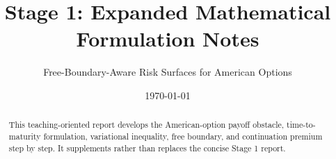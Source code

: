 \documentclass[11pt]{article}
\title{Stage 1: Expanded Mathematical Formulation Notes}
\author{Free-Boundary-Aware Risk Surfaces for American Options}
\date{\today}
\begin{document}
\maketitle
\begin{abstract}
This teaching-oriented report develops the American-option payoff obstacle,
time-to-maturity formulation, variational inequality, free boundary, and
continuation premium step by step. It supplements rather than replaces the
concise Stage 1 report.
\end{abstract}

\tableofcontents
\newpage

\end{document}
